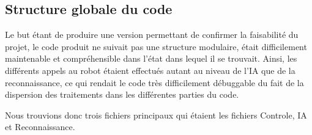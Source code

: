     \subsection{Structure globale du code}
    \par Le but étant de produire une version permettant de confirmer la faisabilité du projet, 
    le code produit ne suivait pas une structure modulaire, était difficilement maintenable et 
    compréhensible dans l'état dans lequel il se trouvait. Ainsi, les différents appels au robot 
    étaient effectués autant au niveau de l'IA que de la reconnaissance, ce qui rendait le code 
    très difficilement débuggable du fait de la dispersion des traitements dans les différentes 
    parties du code.
    
    \par Nous trouvions donc trois fichiers principaux qui étaient les fichiers Controle, IA et Reconnaissance.

\pagebreak
